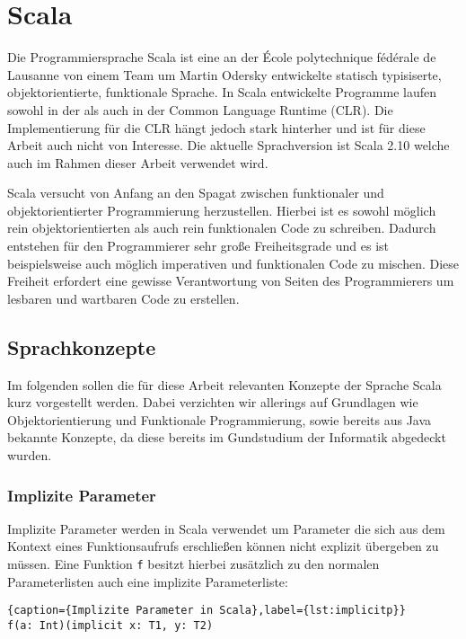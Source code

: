 \section{Scala}

Die Programmiersprache Scala ist eine an der École polytechnique fédérale de  Lausanne von einem
Team um Martin Odersky entwickelte statisch typisiserte,  objektorientierte, funktionale
Sprache\cite{scala}. In Scala entwickelte Programme laufen  sowohl in der  als auch in der
Common  Language Runtime (CLR). Die Implementierung für die CLR hängt jedoch stark  hinterher und
ist für diese Arbeit auch nicht von Interesse. Die aktuelle Sprachversion ist Scala 2.10 welche auch
im Rahmen dieser Arbeit verwendet wird.

Scala versucht von Anfang an den Spagat zwischen funktionaler und  objektorientierter Programmierung
herzustellen. Hierbei ist es sowohl möglich  rein objektorientierten als auch rein funktionalen Code
zu schreiben. Dadurch  entstehen für den Programmierer sehr große Freiheitsgrade und es ist
beispielsweise auch möglich imperativen und funktionalen Code zu mischen. Diese  Freiheit erfordert
eine gewisse Verantwortung von Seiten des Programmierers um  lesbaren und wartbaren Code zu
erstellen.

\subsection{Sprachkonzepte}

Im folgenden sollen die für diese Arbeit relevanten Konzepte der Sprache Scala kurz vorgestellt
werden. Dabei verzichten wir allerings auf Grundlagen wie Objektorientierung und Funktionale
Programmierung, sowie bereits aus Java bekannte Konzepte, da diese bereits im Gundstudium der
Informatik abgedeckt wurden.

\subsubsection{Implizite Parameter}

Implizite Parameter werden in Scala verwendet um Parameter die sich aus dem  Kontext eines
Funktionsaufrufs erschließen können nicht explizit übergeben zu müssen. Eine Funktion \texttt{f}
besitzt hierbei zusätzlich zu den normalen  Parameterlisten auch eine implizite Parameterliste:

\begin{lstlisting}{caption={Implizite Parameter in Scala},label={lst:implicitp}}
f(a: Int)(implicit x: T1, y: T2)
\end{lstlisting}

